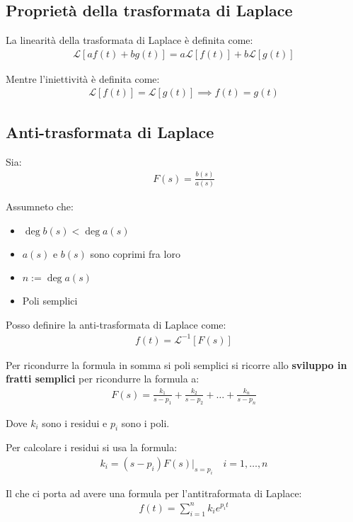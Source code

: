 \subsection{Proprietà della trasformata di Laplace}
La linearità della trasformata di Laplace è definita come:
\begin{align}
	\mathcal{L} [a f(t) + b g(t)] = a \mathcal{L} [f(t)] + b \mathcal{L} [g(t)]
\end{align}

Mentre l'iniettività è definita come:
\begin{align}
	\mathcal{L} [f(t)] = \mathcal{L} [g(t)] \implies f(t) = g(t)
\end{align}


\subsection{Anti-trasformata di Laplace}

Sia:
\begin{align}
  F(s) = \frac{b(s)}{a(s)}
\end{align}

Assumneto che:
\begin{itemize}
  \item $\deg b(s) < \deg a(s)$
  \item $a(s)$ e $b(s)$ sono coprimi fra loro
  \item $n := \deg a(s)$
  \item Poli semplici
\end{itemize}

Posso definire la anti-trasformata di Laplace come:
\begin{align}
  f(t) = \mathcal{L}^{-1} [F(s)]
\end{align}


Per ricondurre la formula in somma si poli semplici si ricorre allo \textbf{sviluppo in fratti semplici} per ricondurre la formula a:
\begin{align}
  F(s) = \frac{k_1}{s-p_1} + \frac{k_2}{s-p_2} + \dots + \frac{k_n}{s-p_n}
\end{align}

Dove $k_i$ sono i residui e $p_i$ sono i poli.

Per calcolare i residui si usa la formula:
\begin{align}
  k_i = (s - p_i) F(s) \bigg|_{s = p_i} \quad i = 1, \dots, n
\end{align}

Il che ci porta ad avere una formula per l'antitraformata di Laplace:
\begin{align}
  f(t) = \sum_{i=1}^{n} k_i e^{p_i t}
\end{align}


